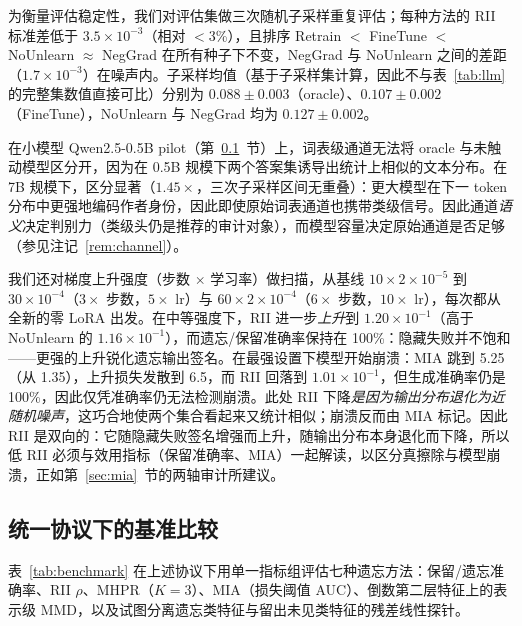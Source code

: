 为衡量评估稳定性，我们对评估集做三次随机子采样重复评估；每种方法的 RII 标准差低于 $3.5{\times}10^{-3}$（相对 $<$3\%），且排序 Retrain $<$ \allowbreak FineTune $<$ \allowbreak NoUnlearn ${\approx}$ \allowbreak NegGrad 在所有种子下不变，NegGrad 与 NoUnlearn 之间的差距（$1.7{\times}10^{-3}$）在噪声内。子采样均值（基于子采样集计算，因此不与表~\ref{tab:llm} 的完整集数值直接可比）分别为 $0.088\pm0.003$（oracle）、$0.107\pm0.002$（FineTune），NoUnlearn 与 NegGrad 均为 $0.127\pm0.002$。

在小模型 Qwen2.5-0.5B pilot（第~\ref{sec:benchmark}~节）上，词表级通道无法将 oracle 与未触动模型区分开，因为在 0.5B 规模下两个答案集诱导出统计上相似的文本分布。在 7B 规模下，区分显著（$1.45\times$，三次子采样区间无重叠）：更大模型在下一 token 分布中更强地编码作者身份，因此即使原始词表通道也携带类级信号。因此通道\emph{语义}决定判别力（类级头仍是推荐的审计对象），而模型容量决定原始通道是否足够（参见注记~\ref{rem:channel}）。

我们还对梯度上升强度（步数 $\times$ 学习率）做扫描，从基线 $10\times 2{\times}10^{-5}$ 到 $30\times 10^{-4}$（$3\times$ 步数，$5\times$ lr）与 $60\times 2{\times}10^{-4}$（$6\times$ 步数，$10\times$ lr），每次都从全新的零 LoRA 出发。在中等强度下，RII 进一步\emph{上升}到 $1.20{\times}10^{-1}$（高于 NoUnlearn 的 $1.16{\times}10^{-1}$），而遗忘/保留准确率保持在 100\%：隐藏失败并不饱和——更强的上升锐化遗忘输出签名。在最强设置下模型开始崩溃：MIA 跳到 5.25（从 1.35），上升损失发散到 6.5，而 RII 回落到 $1.01{\times}10^{-1}$，但生成准确率仍是 100\%，因此仅凭准确率仍无法检测崩溃。此处 RII 下降\emph{是因为输出分布退化为近随机噪声}，这巧合地使两个集合看起来又统计相似；崩溃反而由 MIA 标记。因此 RII 是双向的：它随隐藏失败签名增强而上升，随输出分布本身退化而下降，所以低 RII 必须与效用指标（保留准确率、MIA）一起解读，以区分真擦除与模型崩溃，正如第~\ref{sec:mia}~节的两轴审计所建议。

\subsection{统一协议下的基准比较}
\label{sec:benchmark}

表~\ref{tab:benchmark} 在上述协议下用单一指标组评估七种遗忘方法：保留/遗忘准确率、RII $\rho$、MHPR（$K{=}3$）、MIA（损失阈值 AUC）、倒数第二层特征上的表示级 MMD，以及试图分离遗忘类特征与留出未见类特征的残差线性探针。

